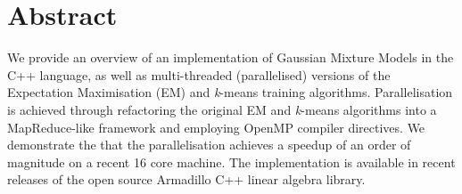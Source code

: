 \section*{Abstract}

We provide an overview of an implementation of Gaussian Mixture Models in the C++ language,
as well as multi-threaded (parallelised) versions of the Expectation Maximisation (EM) and {\it k}-means training algorithms.
Parallelisation is achieved through refactoring the original EM and {\it k}-means algorithms into a MapReduce-like framework
and employing OpenMP compiler directives.
We demonstrate the that the parallelisation achieves a speedup of an order of magnitude on a recent 16 core machine.
The implementation is available in recent releases of the open source Armadillo C++ linear algebra library.

